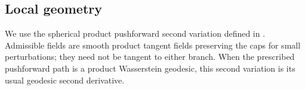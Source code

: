 \noindent\begin{minipage}{\linewidth}
\subsection{Local geometry}
\label{subsec:mf-curvature-pieces}

We use the spherical product pushforward second variation defined in
.
Admissible fields are smooth product tangent fields preserving the caps for
small perturbations; they need not be tangent to either branch. When the
prescribed pushforward path is a product Wasserstein geodesic, this second variation
is its usual geodesic second derivative.

\end{minipage}


